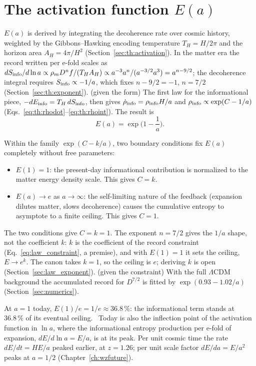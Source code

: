 \section{The activation function \texorpdfstring{$E(a)$}{E(a)}}\label{sec:eg_activation}
$E(a)$ is derived by integrating the decoherence rate over cosmic history, weighted by the Gibbons--Hawking encoding temperature $T_H=H/2\pi$ and the
horizon area $A_H=4\pi/H^2$ (Section~\ref{sec:th:activation}). In the matter era the record written per e-fold scales as
$dS_{\rm info}/d\ln a\propto\rho_mD^nf/(T_HA_H)\propto a^{-3}a^n/(a^{-3/2}a^3)=a^{n-9/2}$; the decoherence integral requires $S_{\rm info}\propto-1/a$, which
fixes $n-9/2=-1$, $n=7/2$ (Section~\ref{sec:th:exponent}). \derived{} (given the form) The first law for the informational piece, $-dE_{\rm info}=T_H\,dS_{\rm info}$, then
gives $\dot\rho_{\rm info}=\rho_{\rm info}H/a$ and $\rho_{\rm info}\propto\exp(C-1/a)$ (Eqs.~\eqref{eq:th:rhodot}--\eqref{eq:th:rhoint}). The result is
\begin{equation}E(a)=\exp\Big(1-\frac1a\Big).\label{eq:eg_Ea}\end{equation}
\derived

Within the family $\exp(C-k/a)$, two boundary conditions fix $E(a)$ completely without free parameters:
\begin{itemize}
\item $E(1)=1$: the present-day informational contribution is normalized to the matter energy density scale. This gives $C=k$.
\item $E(a)\to e$ as $a\to\infty$: the self-limiting nature of the feedback (expansion dilutes matter, slows decoherence) causes the cumulative entropy to
asymptote to a finite ceiling. This gives $C=1$.
\end{itemize}
The two conditions give $C=k=1$. The exponent $n=7/2$ gives the $1/a$ shape, not the coefficient $k$: $k$ is the coefficient of the record constraint (Eq.~\eqref{eq:law_constraint}, a premise), and with $E(1)=1$ it sets the ceiling, $E\to e^k$. The canon takes $k=1$, so the ceiling is $e$; deriving $k$ is open (Section~\ref{sec:law_exponent}). \derived{} (given the constraint) With the full
$\Lambda$CDM background the accumulated record for $D^{7/2}$ is fitted by $\exp(0.93-1.02/a)$ (Section~\ref{sec:numerics}). \calc

At $a=1$ today, $E(1)/e=1/e\approx36.8\,\%$: the informational term stands at $36.8\,\%$ of its eventual ceiling. \calc\ Today is also the inflection point of
the activation function in $\ln a$, where the informational entropy production per e-fold of expansion, $dE/d\ln a=E/a$, is at its peak. Per unit cosmic
time the rate $dE/dt=HE/a$ peaked earlier, at $z=1.26$; per unit scale factor $dE/da=E/a^2$ peaks at $a=1/2$ (Chapter~\ref{ch:wzfuture}). \calc

